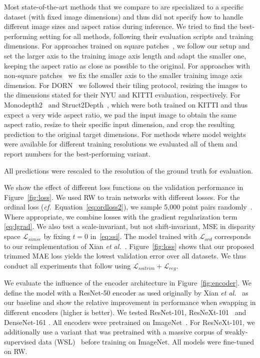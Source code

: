 Most state-of-the-art methods that we compare to are specialized to a specific dataset (with fixed image dimensions) and thus did not specify how to handle different image sizes and aspect ratios during inference. We tried to find the best-performing setting for all methods, following their evaluation scripts and training dimensions. For approaches trained on square patches~\cite{Xian2018}, we follow our setup and set the larger axis to the training image axis length and adapt the smaller one, keeping the aspect ratio as close as possible to the original. For approaches with non-square patches~\cite{Chen2016,LiSnavely2018,Li2019,Wang2019} we fix the smaller axis to the smaller training image axis dimension. For DORN~\cite{Fu2018} we followed their tiling protocol, resizing the images to the dimensions stated for their NYU and KITTI evaluation, respectively. For Monodepth2~\cite{Godard2019} and Struct2Depth~\cite{Casser2019}, which were both trained on KITTI and thus expect a very wide aspect ratio, we pad the input image  to obtain the same aspect ratio, resize to their specific input dimension, and crop the resulting prediction to the original target dimensions. For methods where model weights were available for different training resolutions we evaluated all of them and report numbers for the best-performing variant.

All predictions were rescaled to the resolution of the ground truth for evaluation.

 We show the effect of different loss functions on the validation performance in Figure~\ref{fig:loss}.
We used RW to train networks with different losses. For the ordinal loss (\MakeLowercase{\textit{cf.}}\ Equation~\eqref{eq:ordloss2}), we sample 5,000 point pairs randomly~\cite{Xian2018}. Where appropriate, we combine losses with the gradient regularization term \eqref{eq:lgrad}. We also test a scale-invariant, but not shift-invariant, MSE in disparity space $\mathcal{L}_{simse}$ by fixing $t\!=\!0$ in~\eqref{eq:ssi}.
The model trained with $\mathcal{L}_{ord}$ corresponds to our reimplementation of Xian \MakeLowercase{\textit{et al.}}~\cite{Xian2018}.
Figure~\ref{fig:loss} shows that our proposed trimmed MAE loss yields the lowest validation error over all datasets. We thus conduct all experiments that follow using $\mathcal{L}_{ssitrim} + \mathcal{L}_{reg}$.

 We evaluate the influence of the encoder architecture in Figure~\ref{fig:encoder}. We define the model with a ResNet-50 \cite{He2016} encoder as used originally by Xian \MakeLowercase{\textit{et al.}}~\cite{Xian2018} as our baseline and show the relative improvement in performance when swapping in different encoders (higher is better). We tested ResNet-101, ResNeXt-101~\cite{Xie2017} and DenseNet-161 \cite{Huang2017}. All encoders were pretrained on ImageNet~\cite{Deng2009}. For ResNeXt-101, we additionally use a variant that was pretrained with a massive corpus of weakly-supervised data (WSL)~\cite{Mahajan2018} before training on ImageNet. All models were fine-tuned on RW.

